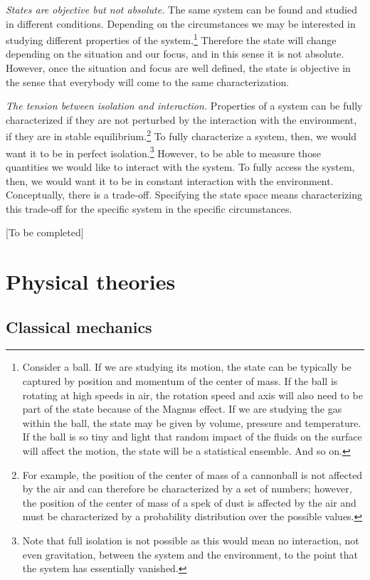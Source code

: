 \documentclass[twocolumn]{article}
\begin{document}
\emph{States are objective but not absolute.} The same system can be found and studied in different conditions. Depending on the circumstances we may be interested in studying different properties of the system.\footnote{Consider a ball. If we are studying its motion, the state can be typically be captured by position and momentum of the center of mass. If the ball is rotating at high speeds in air, the rotation speed and axis will also need to be part of the state because of the Magnus effect. If we are studying the gas within the ball, the state may be given by volume, pressure and temperature. If the ball is so tiny and light that random impact of the fluids on the surface will affect the motion, the state will be a statistical ensemble. And so on.} Therefore the state will change depending on the situation and our focus, and in this sense it is not absolute. However, once the situation and focus are well defined, the state is objective in the sense that everybody will come to the same characterization.

\emph{The tension between isolation and interaction.} Properties of a system can be fully characterized if they are not perturbed by the interaction with the environment, if they are in stable equilibrium.\footnote{For example, the position of the center of mass of a cannonball is not affected by the air and can therefore be characterized by a set of numbers; however, the position of the center of mass of a spek of dust is affected by the air and must be characterized by a probability distribution over the possible values.} To fully characterize a system, then, we would want it to be in perfect isolation.\footnote{Note that full isolation is not possible as this would mean no interaction, not even gravitation, between the system and the environment, to the point that the system has essentially vanished.} However, to be able to measure those quantities we would like to interact with the system. To fully access the system, then, we would want it to be in constant interaction with the environment. Conceptually, there is a trade-off. Specifying the state space means characterizing this trade-off for the specific system in the specific circumstances.

[To be completed]

\section{Physical theories}

\subsection{Classical mechanics}
\end{document}
